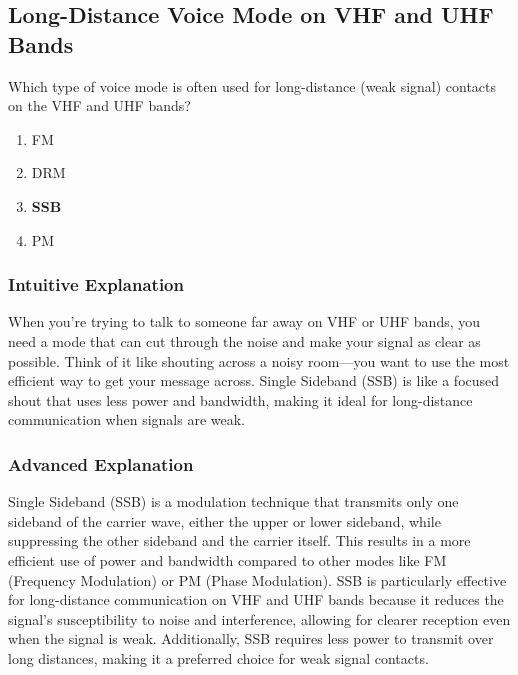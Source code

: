 \subsection{Long-Distance Voice Mode on VHF and UHF Bands}
\label{T8A03}

\begin{tcolorbox}[colback=gray!10!white,colframe=black!75!black,title=T8A03]
Which type of voice mode is often used for long-distance (weak signal) contacts on the VHF and UHF bands?
\begin{enumerate}[noitemsep]
    \item FM
    \item DRM
    \item \textbf{SSB}
    \item PM
\end{enumerate}
\end{tcolorbox}

\subsubsection*{Intuitive Explanation}
When you're trying to talk to someone far away on VHF or UHF bands, you need a mode that can cut through the noise and make your signal as clear as possible. Think of it like shouting across a noisy room—you want to use the most efficient way to get your message across. Single Sideband (SSB) is like a focused shout that uses less power and bandwidth, making it ideal for long-distance communication when signals are weak.

\subsubsection*{Advanced Explanation}
Single Sideband (SSB) is a modulation technique that transmits only one sideband of the carrier wave, either the upper or lower sideband, while suppressing the other sideband and the carrier itself. This results in a more efficient use of power and bandwidth compared to other modes like FM (Frequency Modulation) or PM (Phase Modulation). SSB is particularly effective for long-distance communication on VHF and UHF bands because it reduces the signal's susceptibility to noise and interference, allowing for clearer reception even when the signal is weak. Additionally, SSB requires less power to transmit over long distances, making it a preferred choice for weak signal contacts.